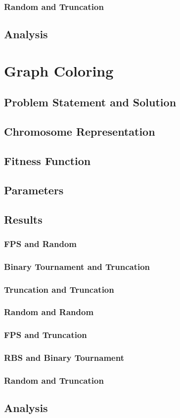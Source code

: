 \documentclass{article}
\begin{document}
\subsubsection {Random and Truncation}
\subsection{Analysis}

\section{Graph Coloring}
\subsection{Problem Statement and Solution}
\subsection{Chromosome Representation}
\subsection{Fitness Function}
\subsection{Parameters}
\subsection{Results} 
\subsubsection {FPS and Random}
\subsubsection {Binary Tournament and Truncation}
\subsubsection {Truncation and Truncation}
\subsubsection {Random and Random}
\subsubsection {FPS and Truncation}
\subsubsection {RBS and Binary Tournament}
\subsubsection {Random and Truncation}
\subsection{Analysis}
\end{document}

